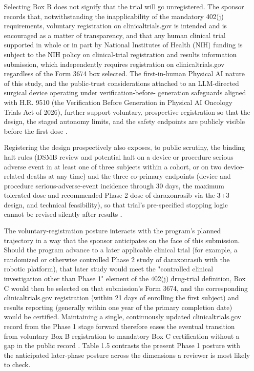 Selecting Box B does not signify that the trial will go unregistered.
The sponsor records that, notwithstanding the inapplicability of the
mandatory 402(j) requirements, voluntary registration on
clinicaltrials.gov is intended and is encouraged as a matter of
transparency, and that any human clinical trial supported in whole or in
part by National Institutes of Health (NIH) funding is subject to the NIH
policy on clinical-trial registration and results information submission,
which independently requires registration on clinicaltrials.gov
regardless of the Form 3674 box selected. The first-in-human Physical AI
nature of this study, and the public-trust considerations attached to an
LLM-directed surgical device operating under verification-before-
generation safeguards aligned with H.R. 9510 (the Verification Before
Generation in Physical AI Oncology Trials Act of 2026), further support
voluntary, prospective registration so that the design, the staged
autonomy limits, and the safety endpoints are publicly visible before the
first dose \cite{congress9510, clintrustpai, paipredict4x}. 

Registering
the design prospectively also exposes, to public scrutiny, the binding
halt rules (DSMB review and potential halt on a device or procedure
serious adverse event in at least one of three subjects within a cohort,
or on two device-related deaths at any time) and the three co-primary
endpoints (device and procedure serious-adverse-event incidence through 30
days, the maximum tolerated dose and recommended Phase 2 dose of
daraxonrasib via the 3+3 design, and technical feasibility), so that
trial's pre-specified stopping logic cannot be revised silently after
results \cite{paiautospons, oncotrialllm}.

The voluntary-registration posture interacts with the program's planned
trajectory in a way that the sponsor anticipates on the face of this
submission. Should the program advance to a later applicable clinical
trial (for example, a randomized or otherwise controlled Phase 2 study of
daraxonrasib with the robotic platform), that later study would meet the
"controlled clinical investigation other than Phase 1" element of the
402(j) drug-trial definition, Box C would then be selected on that
submission's Form 3674, and the corresponding clinicaltrials.gov
registration (within 21 days of enrolling the first subject) and results
reporting (generally within one year of the primary completion date) would
be certified. Maintaining a single, continuously updated
clinicaltrials.gov record from the Phase 1 stage forward therefore eases
the eventual transition from voluntary Box B registration to mandatory Box
C certification without a gap in the public record \cite{phase1guidance,
paisitedocpk}. Table 1.5 contrasts the present Phase 1 posture with the
anticipated later-phase posture across the dimensions a reviewer is most
likely to check.

